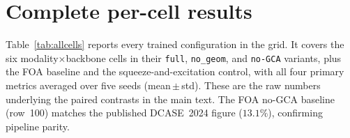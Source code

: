 \appendix

\section{Complete per-cell results}
\label{sec:appendix_cells}
Table~\ref{tab:allcells} reports every trained configuration in the grid. It
covers the six modality$\times$backbone cells in their \texttt{full},
\texttt{no\_geom}, and \texttt{no-GCA} variants, plus the FOA baseline and the
squeeze-and-excitation control, with all four primary metrics averaged over five
seeds (mean\,$\pm$\,std). These are the raw numbers underlying the paired
contrasts in the main text. The FOA no-GCA baseline (row~100) matches the
published DCASE~2024 figure ($13.1\%$), confirming pipeline parity.

\begin{table}[t]
\centering
\renewcommand{\arraystretch}{0.92}
\caption{Complete in-domain (STARSS23 dev-test) results for all configurations,
mean\,$\pm$\,std over five seeds. $F_{20\degsym}$ and SELD score: higher/lower is
better respectively; DOAE$_\mathrm{CD}$ and RDE: lower is better. ``full'' $=$
geometry-aware GCA, ``no\_geom'' $=$ GCA with the geometry bias disabled,
``no-GCA'' $=$ channel attention removed, ``SE'' $=$ vanilla squeeze-and-excitation.}
\label{tab:allcells}
\scriptsize
\setlength{\tabcolsep}{3pt}
\end{table}
